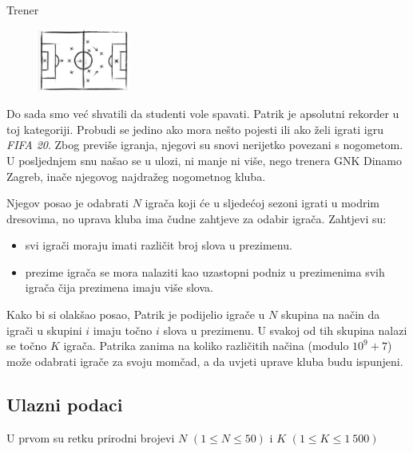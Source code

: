\begin{statement}[
  problempoints=110,
  timelimit=2 sekunde,
  memorylimit=512 MiB,
]{Trener}

\setlength\intextsep{-0.1cm}
\begin{figure}
\centering
\includegraphics[width=0.27\textwidth]{img/trener.png}
\end{figure}

Do sada smo već shvatili da studenti vole spavati. Patrik je apsolutni rekorder
u toj kategoriji. Probudi se jedino ako mora nešto pojesti ili ako želi
igrati igru \textit{FIFA 20}. Zbog previše igranja, njegovi su snovi nerijetko
povezani s nogometom. U posljednjem snu našao se u ulozi, ni manje ni više,
nego trenera GNK Dinamo Zagreb, inače njegovog najdražeg nogometnog kluba.

Njegov posao je odabrati $N$ igrača koji će u sljedećoj sezoni igrati u modrim
dresovima, no uprava kluba ima čudne zahtjeve za odabir igrača. Zahtjevi su:

\begin{itemize}
  \item svi igrači moraju imati različit broj slova u prezimenu.
  \item prezime igrača se mora nalaziti kao uzastopni podniz u prezimenima svih
        igrača čija prezimena imaju više slova.
\end{itemize}

Kako bi si olakšao posao, Patrik je podijelio igrače u $N$ skupina na način da
igrači u skupini $i$ imaju točno $i$ slova u prezimenu. U svakoj od tih
skupina nalazi se točno $K$ igrača. Patrika zanima na koliko različitih
načina (modulo $10^9 + 7$) može odabrati igrače za svoju momčad, a da uvjeti
uprave kluba budu ispunjeni.

\subsection*{Ulazni podaci}
U prvom su retku prirodni brojevi $N$ $(1 \le N \le 50)$ i $K$ $(1 \le K \le 1\
500)$


\end{statement}
